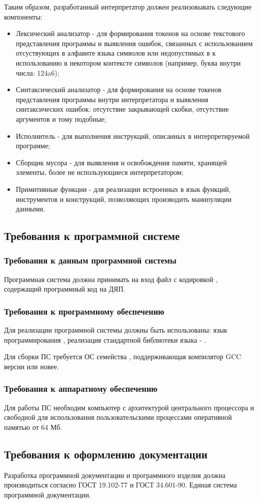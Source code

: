 Таким образом, разработанный интерпретатор должен реализовывать следующие компоненты:
\begin{itemize}
	\item Лексический анализатор - для формирования токенов на основе текстового представления программы и выявления ошибок, связанных с использованием отсуствующих в алфавите языка символов или недопустимых в к использованию в некотором контексте символов (например, буква внутри числа: 124a6);
	\item Синтаксический анализатор - для формирования на основе токенов представления программы внутри интерпретатора и выявления синтаксических ошибок: отсутствие закрывающей скобки, отсутствие аргументов и тому подобные;
	\item Исполнитель - для выполнения инструкций, описанных в интерпретируемой программе;
	\item Сборщик мусора - для выявления и освобождения памяти, хранящей элементы, более не использующиеся интерпретатором;
	\item Примитивные функции - для реализации встроенных в язык функций, инструментов и конструкций, позволяющих производить манипуляции данными.
\end{itemize}


\subsection{Требования к программной системе}

\subsubsection{Требования к данным программной системы}
Программная система должна принимать на вход файл с кодировкой , содержащий программный код на ДЯП.

\subsubsection{Требования к программному обеспечению}
Для реализации программной системы должны быть использованы: язык программирования , реализация стандартной библиотеки языка - .

Для сборки ПС требуется ОС семейства , поддерживающая компилятор GCC версии  или новее.

\subsubsection{Требования к аппаратному обеспечению}
Для работы ПС необходим компьютер с архитектурой центрального процессора  и свободной для использования пользовательскими процессами оперативной памятью от 64 Мб.

\subsection{Требования к оформлению документации}

Разработка программной документации и программного изделия должна производиться согласно ГОСТ 19.102-77 и ГОСТ 34.601-90. Единая система программной документации.
